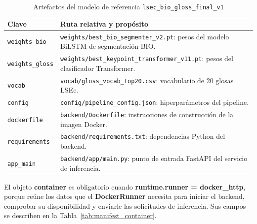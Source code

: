 \begin{table}[H]
\centering
\caption{Artefactos del modelo de referencia \texttt{lsec\_bio\_gloss\_final\_v1}}
\label{tab:manifest_artifacts}
\scriptsize
\renewcommand{\arraystretch}{1.08}
\setlength{\tabcolsep}{4pt}

\begin{tabular}{
    >{\raggedright\arraybackslash}p{3.1cm}
    >{\raggedright\arraybackslash}p{9.8cm}
}
\toprule
\textbf{Clave} & \textbf{Ruta relativa y propósito} \\
\midrule
\texttt{weights\_bio} & \texttt{weights/best\_bio\_segmenter\_v2.pt}: pesos del modelo BiLSTM de segmentación BIO. \\
\texttt{weights\_gloss} & \texttt{weights/best\_keypoint\_transformer\_v11.pt}: pesos del clasificador Transformer. \\
\texttt{vocab} & \texttt{vocab/gloss\_vocab\_top20.csv}: vocabulario de 20 glosas LSEc. \\
\texttt{config} & \texttt{config/pipeline\_config.json}: hiperparámetros del pipeline. \\
\texttt{dockerfile} & \texttt{backend/Dockerfile}: instrucciones de construcción de la imagen Docker. \\
\texttt{requirements} & \texttt{backend/requirements.txt}: dependencias Python del backend. \\
\texttt{app\_main} & \texttt{backend/app/main.py}: punto de entrada FastAPI del servicio de inferencia. \\
\bottomrule
\end{tabular}
\end{table}

El objeto \textbf{container} es obligatorio cuando \textbf{runtime.runner = docker\_http}, porque reúne los datos que el \textbf{DockerRunner} necesita para iniciar el backend, comprobar su disponibilidad y enviarle las solicitudes de inferencia. Sus campos se describen en la Tabla~\ref{tab:manifest_container}.

